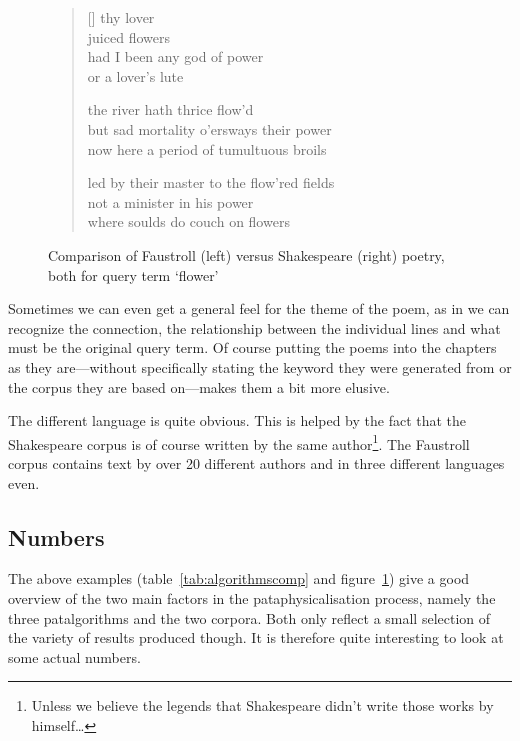 \begin{figure}[!htbp]
\begin{minipage}{.45\linewidth}
\begin{verse}[\versewidth]
    thy lover\\
    juiced flowers\\
    had I been any god of power\\
    or a lover's lute

    the river hath thrice flow'd\\
    but sad mortality o'ersways their power\\
    now here a period of tumultuous broils

    led by their master to the flow'red fields\\
    not a minister in his power\\
    where soulds do couch on flowers
  \end{verse}
\end{minipage}
\caption[Faustroll vs. Shakespeare poetry]{Comparison of Faustroll (left) versus Shakespeare (right) poetry, both for query term `flower'}
\label{fig:2poems}
\end{figure}

Sometimes we can even get a general feel for the theme of the poem, as in we can recognize the connection, the relationship between the individual lines and what must be the original query term. Of course putting the poems into the chapters as they are---without specifically stating the keyword they were generated from or the corpus they are based on---makes them a bit more elusive.

The different language is quite obvious. This is helped by the fact that the Shakespeare corpus is of course written by the same author\footnote{Unless we believe the legends that Shakespeare didn't write those works by himself\ldots}. The Faustroll corpus contains text by over 20 different authors and in three different languages even.


\subsection{Numbers}
\label{s:numbers}

The above examples (table~\ref{tab:algorithmscomp} and figure~\ref{fig:2poems}) give a good overview of the two main factors in the pataphysicalisation process, namely the three patalgorithms and the two corpora. Both only reflect a small selection of the variety of results produced though. It is therefore quite interesting to look at some actual numbers.

